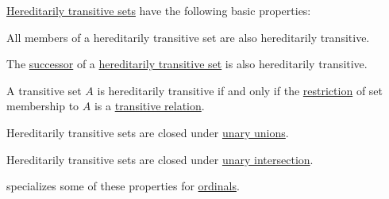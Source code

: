 \begin{proposition}\label{thm:def:hereditarily_transitive_set}
  \hyperref[def:hereditarily_transitive_set]{Hereditarily transitive sets} have the following basic properties:
  \begin{thmenum}
     All members of a hereditarily transitive set are also hereditarily transitive.

     The \hyperref[def:ordinal_successor]{successor} of a \hyperref[def:hereditarily_transitive_set]{hereditarily transitive set} is also hereditarily transitive.

     A transitive set \( A \) is hereditarily transitive if and only if the \hyperref[def:relation/restriction]{restriction} of set membership to \( A \) is a \hyperref[def:binary_relation/transitive]{transitive relation}.

     Hereditarily transitive sets are closed under \hyperref[def:set_union/unary]{unary unions}.

     Hereditarily transitive sets are closed under \hyperref[def:set_intersection/unary]{unary intersection}.
  \end{thmenum}
\end{proposition}
\begin{comments}
  \item {} specializes some of these properties for \hyperref[def:ordinal]{ordinals}.
\end{comments}
